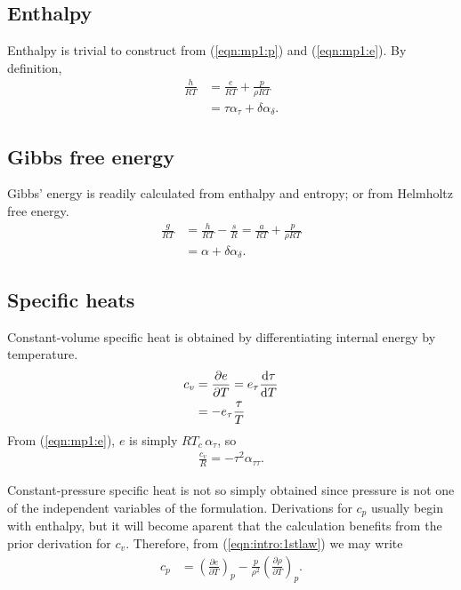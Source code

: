 \subsection{Enthalpy}\label{sec:mp1:h}

Enthalpy is trivial to construct from (\ref{eqn:mp1:p}) and (\ref{eqn:mp1:e}).  By definition, 
\begin{align}
\frac{h}{R T} &= \frac{e}{RT} + \frac{p}{\rho R T}\nonumber\\
 &= \tau \alpha_\tau + \delta \alpha_\delta.\label{eqn:mp1:h}
\end{align}

\subsection{Gibbs free energy}\label{sec:mp1:g}

Gibbs' energy is readily calculated from enthalpy and entropy; or from Helmholtz free energy.
\begin{align}
\frac{g}{R T} &= \frac{h}{RT} - \frac{s}{R} = \frac{a}{RT} + \frac{p}{\rho RT}\nonumber\\
&= \alpha + \delta \alpha_\delta.
\end{align}

\subsection{Specific heats}\label{sec:mp1:c}

Constant-volume specific heat is obtained by differentiating internal energy by temperature.
\begin{align*}
c_v &= \frac{\partial e}{\partial T} = e_\tau \frac{\mathrm{d} \tau}{\mathrm{d} T}\\
 &= -e_\tau \frac{\tau}{T}
\end{align*}
From (\ref{eqn:mp1:e}), $e$ is simply $R T_c \, \alpha_\tau$, so
\begin{align}
\frac{c_v}{R} = - \tau^2 \alpha_{\tau\tau}\label{eqn:mp1:cv}.
\end{align}

Constant-pressure specific heat is not so simply obtained since pressure is not one of the independent variables of the formulation.  Derivations for $c_p$ usually begin with enthalpy, but it will become aparent that the calculation benefits from the prior derivation for $c_v$.  Therefore, from (\ref{eqn:intro:1stlaw}) we may write
\begin{align*}
c_p &= \left(\frac{\partial e}{\partial T}\right)_p - \frac{p}{\rho^2} \left(\frac{\partial \rho}{\partial T}\right)_p.
\end{align*}

